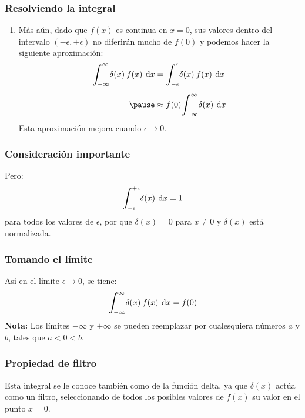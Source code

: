 \documentclass[12pt]{beamer}
\begin{document}
\begin{frame}
\frametitle{Resolviendo la integral}
\begin{enumerate}[<+->]
\conti
\item Más aún, dado que $f (x)$ es continua en $x = 0$, sus valores dentro del intervalo $( - \epsilon, + \epsilon)$ no diferirán mucho de $f (0)$ y podemos hacer la siguiente aproximación:
\begin{eqnarray*}
\begin{aligned}
\scaleint{6ex}_{\bs -\infty}^{\infty} \delta (x) \: f (x) \: \dd{x} &= \scaleint{6ex}_{\bs -\epsilon}^{\epsilon} \delta (x) \: f (x) \: \dd{x} \\[0.5em] \pause
&\approx f (0) \scaleint{6ex}_{\bs -\infty}^{\infty} \delta (x) \: \dd{x}
\end{aligned}
\end{eqnarray*}
Esta aproximación mejora cuando $\epsilon \to 0$.
\end{enumerate}
\end{frame}

\begin{frame}
\frametitle{Consideración importante}
Pero:
\pause
\begin{align*}
\scaleint{6ex}_{\bs -\epsilon}^{+\epsilon} \delta (x) \: \dd{x} = 1
\end{align*}
para todos los valores de $\epsilon$, por que $\delta (x) = 0$ para $x \neq 0$ y $\delta (x)$ está normalizada.
\end{frame}

\begin{frame}
\frametitle{Tomando el límite}
Así en el límite $\epsilon \to 0$, se tiene:
\pause
\begin{align*}
\scaleint{6ex}_{\bs -\infty}^{\infty} \delta (x) \: f (x) \: \dd{x} = f (0)
\end{align*}
\textbf{Nota: } Los límites $-\infty$ y $+\infty$ se pueden reemplazar por cualesquiera números $a$ y $b$, tales que $a < 0 < b$.
\end{frame}

\begin{frame}
\frametitle{Propiedad de filtro}
Esta integral se le conoce también como  de la función delta, \pause ya que $\delta (x)$ actúa como un filtro, seleccionando de todos los posibles valores de $f (x)$ su valor en el punto $x = 0$.
\end{frame}
\end{document}
